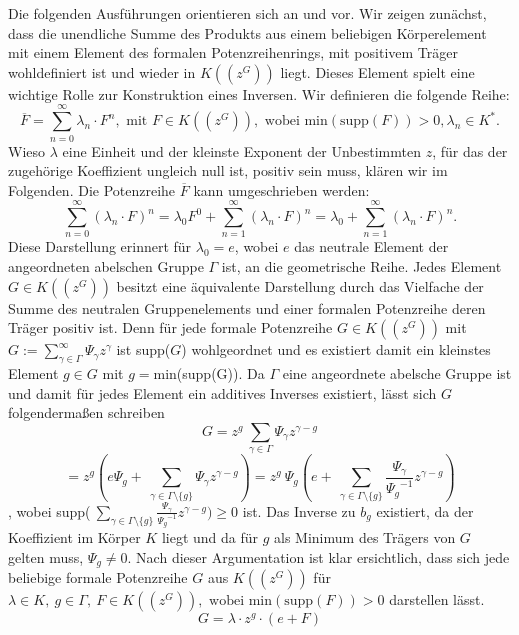 Die folgenden Ausführungen orientieren sich an \cite[S. 196- 198]{fuchs66} und \cite[S. 210- 213]{neumann49} vor.
Wir zeigen zunächst, dass die unendliche Summe des Produkts aus einem beliebigen Körperelement mit einem Element des formalen Potenzreihenrings, mit positivem Träger wohldefiniert ist und wieder in $K\left(\left(z^{G}\right)\right)$ liegt. Dieses Element spielt eine wichtige Rolle zur Konstruktion eines Inversen. Wir definieren die folgende Reihe:
\[\overline{F} = \sum_{n=0}^{\infty}\lambda_n\cdot F^n, \text{ mit } F \in K\left(\left(z^{G}\right)\right), \text{ wobei } \text{min}\left(\text{supp}\left(F\right)\right) > 0, \lambda_n \in K^*. \]
Wieso $\lambda$ eine Einheit und der kleinste Exponent der Unbestimmten $z$, für das der zugehörige Koeffizient ungleich null ist, positiv sein muss, klären wir im Folgenden. Die Potenzreihe $\overline{F}$ kann umgeschrieben werden:
\[\sum_{n=0}^{\infty}\left(\lambda_n\cdot F\right)^n = \lambda_0 F^0 + \sum_{n=1}^{\infty}\left(\lambda_n\cdot F\right)^n = \lambda_0 + \sum_{n=1}^{\infty}\left(\lambda_n\cdot F\right)^n.\] 
Diese Darstellung erinnert für $\lambda_0 = e$, wobei $e$ das neutrale Element der angeordneten abelschen Gruppe $\Gamma$ ist, an die geometrische Reihe. Jedes Element $G \in K\left(\left(z^{G}\right)\right)$ besitzt eine äquivalente Darstellung durch das Vielfache der Summe des neutralen Gruppenelements und einer formalen Potenzreihe deren Träger positiv ist. Denn für jede formale Potenzreihe $G \in K\left(\left(z^{G}\right)\right)$ mit $G:= \sum_{\gamma \in \Gamma}^{\infty}\Psi_\gamma z^\gamma$ ist supp($G$) wohlgeordnet und es existiert damit ein kleinstes Element $g\in G$ mit $g=$min(supp(G)). Da $\Gamma$ eine angeordnete abelsche Gruppe ist und damit für jedes Element ein additives Inverses existiert, lässt sich $G$ folgendermaßen schreiben
\[G= z^g ~\sum_{\gamma \in \Gamma} \Psi_{\gamma} z^{\gamma-g}\]
\[= z^g \left( e \Psi_g + ~\sum_{\gamma \in \Gamma\setminus \lbrace g \rbrace} \Psi_{\gamma} z^{\gamma-g}\right) = z^g ~ \Psi_g \left(e + ~\sum_{\gamma \in \Gamma\setminus \lbrace g \rbrace} \frac{\Psi_{\gamma}}{{\Psi_g}^{-1}} z^{\gamma-g}\right)\]
, wobei supp($~\sum_{\gamma \in \Gamma\setminus \lbrace g \rbrace} \frac{\Psi_{\gamma}}{{\Psi_g}^{-1}} z^{\gamma-g}) \ge 0$ ist.
Das Inverse zu $b_g$ existiert, da der Koeffizient im Körper $K$ liegt und da für $g$ als Minimum des Trägers von $G$ gelten muss, $\Psi_g \neq 0$. 
Nach dieser Argumentation ist klar ersichtlich, dass sich jede beliebige formale Potenzreihe $G$ aus $K\left(\left(z^{G}\right)\right)$ für $\lambda \in K, ~g \in\Gamma,~F \in K\left(\left(z^{G}\right)\right), \text{ wobei } \text{min}\left(\text{supp}\left(F\right)\right) > 0$ darstellen lässt.
\[G = \lambda\cdot z^g\cdot \left(e + F\right)\] 

